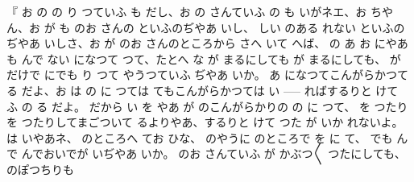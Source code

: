 『
お
の
の
り
つていふ
も
だし、お
の
さんていふ
の
も
いがネエ、お
ちやん、お
が
も
のお
さんの
といふのぢやあ
いし、
しい
のある
れない
といふのぢやあ
いしさ、お
が
のお
さんのところから
さへ
いて
へば、
の
あ
お
にやあ
も
んで
ない
になつて
つて、たとへ
な
が
まるにしても
が
まるにしても、
が
だけで
にでも
り
つて
やうつていふ
ぢやあ
いか。
あ
になつてこんがらかつて
る
だよ、お
は
の
に
つては
てもこんがらかつては
い \------
ればするりと
けて
ふ
の
る
だよ。
だから
い
を
やあ
が
のこんがらかりの
の
に
つて、
を
つたり
を
つたりしてまごついて
るよりやあ、するりと
けて
つた
が
いか
れないよ。
は
いやあネ、
のところへ
てお
ひな、
のやうに
のところで
を
に
て、
でも
んで
んでおいでが
いぢやあ
いか。
のお
さんていふ
が
かぶつ〳〵
つたにしても、
のぽつちりも
